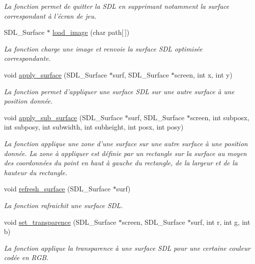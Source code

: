 \begin{DoxyCompactItemize}
\begin{DoxyCompactList}\small\item\em La fonction permet de quitter la S\-D\-L en supprimant notamment la surface correspondant à l'écran de jeu. \end{DoxyCompactList}\item 
S\-D\-L\-\_\-\-Surface $\ast$ \hyperlink{sdl-light_8c_a2a4087096c2f6d728844c4c2549bbc5f}{load\-\_\-image} (char path\mbox{[}$\,$\mbox{]})
\begin{DoxyCompactList}\small\item\em La fonction charge une image et renvoie la surface S\-D\-L optimisée correspondante. \end{DoxyCompactList}\item 
void \hyperlink{sdl-light_8c_a3b6e9c408f9273f7d39bd968df780c80}{apply\-\_\-surface} (S\-D\-L\-\_\-\-Surface $\ast$surf, S\-D\-L\-\_\-\-Surface $\ast$screen, int x, int y)
\begin{DoxyCompactList}\small\item\em La fonction permet d'appliquer une surface S\-D\-L sur une autre surface à une position donnée. \end{DoxyCompactList}\item 
void \hyperlink{sdl-light_8c_a32dbad4e4512e3b99f67c7a5c0d47fe4}{apply\-\_\-sub\-\_\-surface} (S\-D\-L\-\_\-\-Surface $\ast$surf, S\-D\-L\-\_\-\-Surface $\ast$screen, int subposx, int subposy, int subwidth, int subheight, int posx, int posy)
\begin{DoxyCompactList}\small\item\em La fonction applique une zone d'une surface sur une autre surface à une position donnée. La zone à appliquer est définie par un rectangle sur la surface au moyen des coordonnées du point en haut à gauche du rectangle, de la largeur et de la hauteur du rectangle. \end{DoxyCompactList}\item 
void \hyperlink{sdl-light_8c_a95dec76d1425f27dfcaf620522ade661}{refresh\-\_\-surface} (S\-D\-L\-\_\-\-Surface $\ast$surf)
\begin{DoxyCompactList}\small\item\em La fonction rafraichit une surface S\-D\-L. \end{DoxyCompactList}\item 
void \hyperlink{sdl-light_8c_acd278b0336928f80ecb69a04b5f86df8}{set\-\_\-transparence} (S\-D\-L\-\_\-\-Surface $\ast$screen, S\-D\-L\-\_\-\-Surface $\ast$surf, int r, int g, int b)
\begin{DoxyCompactList}\small\item\em La fonction applique la transparence à une surface S\-D\-L pour une certaine couleur codée en R\-G\-B. \end{DoxyCompactList}\end{DoxyCompactItemize}


